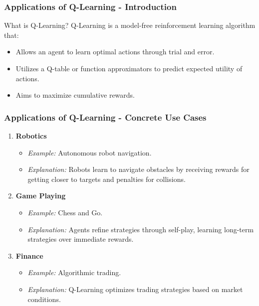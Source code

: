 \documentclass[aspectratio=169]{beamer}
\begin{document}
\begin{frame}[fragile]
    \frametitle{Applications of Q-Learning - Introduction}
    \begin{block}{What is Q-Learning?}
        Q-Learning is a model-free reinforcement learning algorithm that:
        \begin{itemize}
            \item Allows an agent to learn optimal actions through trial and error.
            \item Utilizes a Q-table or function approximators to predict expected utility of actions.
            \item Aims to maximize cumulative rewards.
        \end{itemize}
    \end{block}
\end{frame}

\begin{frame}[fragile]
    \frametitle{Applications of Q-Learning - Concrete Use Cases}
    \begin{enumerate}
        \item \textbf{Robotics}
        \begin{itemize}
            \item \textit{Example:} Autonomous robot navigation.
            \item \textit{Explanation:} Robots learn to navigate obstacles by receiving rewards for getting closer to targets and penalties for collisions.
        \end{itemize}

        \item \textbf{Game Playing}
        \begin{itemize}
            \item \textit{Example:} Chess and Go.
            \item \textit{Explanation:} Agents refine strategies through self-play, learning long-term strategies over immediate rewards.
        \end{itemize}

        \item \textbf{Finance}
        \begin{itemize}
            \item \textit{Example:} Algorithmic trading.
            \item \textit{Explanation:} Q-Learning optimizes trading strategies based on market conditions.
        \end{itemize}
    \end{enumerate}
\end{frame}
\end{document}
